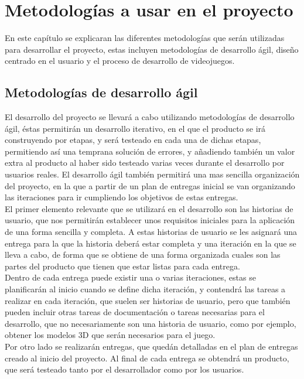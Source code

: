 \chapter{Metodologías a usar en el proyecto}
\label{ch:metodologias}
En este capítulo se explicaran las diferentes metodologías que serán utilizadas para desarrollar el proyecto, estas incluyen metodologías de desarrollo ágil, diseño centrado en el usuario y el proceso de desarrollo de videojuegos.

\section{Metodologías de desarrollo ágil}
El desarrollo del proyecto se llevará a cabo utilizando metodologías de desarrollo ágil, éstas permitirán un desarrollo iterativo, en el que el producto se irá construyendo por etapas, y será testeado en cada una de dichas etapas, permitiendo así una temprana solución de errores, y añadiendo también un valor extra al producto al haber sido testeado varias veces durante el desarrollo por usuarios reales. El desarrollo ágil también permitirá una mas sencilla organización del proyecto, en la que a partir de un plan de entregas inicial se van organizando las iteraciones para ir cumpliendo los objetivos de estas entregas.\\

El primer elemento relevante que se utilizará en el desarrollo son las historias de usuario, que nos permitirán establecer unos requisitos iniciales para la aplicación de una forma sencilla y completa. A estas historias de usuario se les asignará una entrega para la que la historia deberá estar completa y una iteración en la que se lleva a cabo, de forma que se obtiene de una forma organizada cuales son las partes del producto que tienen que estar listas para cada entrega.\\

Dentro de cada entrega puede existir una o varias iteraciones, estas se planificarán al inicio cuando se define dicha iteración, y contendrá las tareas a realizar en cada iteración, que suelen ser historias de usuario, pero que también pueden incluir otras tareas de documentación o tareas necesarias para el desarrollo, que no necesariamente son una historia de usuario, como por ejemplo, obtener los modelos 3D que serán necesarios para el juego.\\

Por otro lado se realizarán entregas, que quedán detalladas en el plan de entregas creado al inicio del proyecto. Al final de cada entrega se obtendrá un producto, que será testeado tanto por el desarrollador como por los usuarios.

